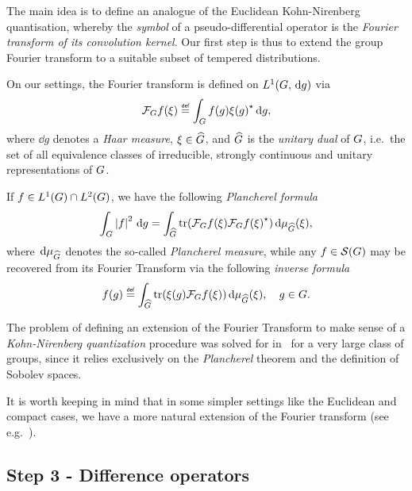 The main idea is to define an analogue of the Euclidean Kohn-Nirenberg quantisation,
whereby the \emph{symbol} of a pseudo-differential operator is the \emph{Fourier transform of its convolution kernel}.
Our first step is thus to extend the group Fourier transform to a suitable subset of tempered distributions.

On our settings,
the Fourier transform is defined on ${L^{1} (G, \,\mathrm{d} g)}$ via
\begin{align*}
    \Fourier f(\xi)
    \defeq \int_\Group f(g) \adj{\xi(g)} \dd g,
\end{align*}
where $\dd g$ denotes a \emph{Haar measure},
$\xi \in {\widehat{G}}$,
and ${\widehat{G}}$ is the \emph{unitary dual} of $G$,
i.e.\ the set of all equivalence classes of irreducible, strongly continuous and unitary representations of $G$.

If $f \in {L^{1} (G)} \cap {L^{2} (G)}$,
we have the following \emph{Plancherel formula}
\begin{align*}
    \int_G \left|{f}\right|^2 \,\mathrm{d} g
    = \int_{{\widehat{G}}}
    \operatorname{tr}(\mathcal{F}_{G} f(\xi) {\mathcal{F}_{G} f(\xi)}^\star)
    \,\mathrm{d} \mu_{{\widehat{G}}}(\xi),
\end{align*}
where $\,\mathrm{d} \mu_{{\widehat{G}}}$ denotes the so-called \emph{Plancherel measure},
while any $f \in {\mathcal{S} (G)}$ may be recovered from its Fourier Transform via
the following \emph{inverse formula}
\begin{align*}
    f(g) \defeq
    \int_{\dualGroup \Group}
    \tr(\xi(g) \Fourier f(\xi))
    \dd \mu_{\dualGroup \Group}(\xi),
    \quad g \in \Group.
\end{align*}

The problem of defining an extension of the Fourier Transform to make sense of a \emph{Kohn-Nirenberg quantization} procedure was solved for in~\cite[Subsection 5.1.1]{FischerRuzhansky16} for a very large class of groups,
since it relies exclusively on the \emph{Plancherel} theorem and the definition of Sobolev spaces.

It is worth keeping in mind that in some simpler settings like the Euclidean and compact cases,
we have a more natural extension of the Fourier transform
(see e.g.~\cite{RuzhanskyTurunen10}).

\subsection*{Step 3 - Difference operators}

